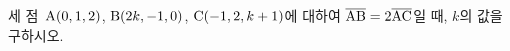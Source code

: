세 점~$\mathrm{A}(0{,}\mkern3mu\mathopen{}1{,}\mkern3mu\mathopen{}2)$, $\mathrm{B}(2k{,}\mkern3mu\mathopen{}-1{,}\mkern3mu\mathopen{}0)$, $\mathrm{C}(-1{,}\mkern3mu\mathopen{}2{,}\mkern3mu\mathopen{}k+1)$에 대하여 $\overline{\mathrm{AB}}=2\overline{\mathrm{AC}}$일 때, $k$의 값을 구하시오.

